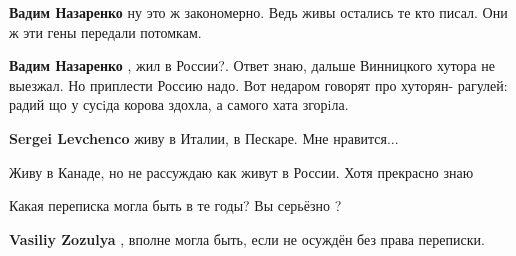 \begin{itemize}
\begin{itemize}
\textbf{Вадим Назаренко} ну это ж закономерно. Ведь живы остались те кто писал. Они ж эти гены передали потомкам.

 
\textbf{Вадим Назаренко} , жил в России?. Ответ знаю, дальше Винницкого хутора
не выезжал. Но приплести Россию надо. Вот недаром говорят про хуторян- рагулей:
радий що у сусiда корова здохла, а самого хата згорiла.

 
\textbf{Sergei Levchenco} живу в Италии, в Пескаре. Мне нравится...

 
Живу в Канаде, но не рассуждаю как живут в России. Хотя прекрасно знаю
\end{itemize}

 
Какая переписка могла быть в те годы? Вы серьёзно ?

\begin{itemize}
 
\textbf{Vasiliy Zozulya} , вполне могла быть, если не осуждён без права переписки.


 

\end{itemize}
\end{itemize}
